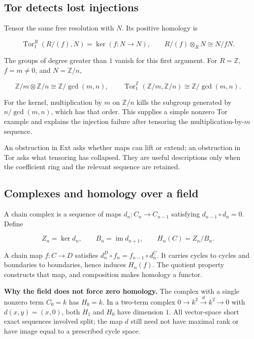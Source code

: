 \documentclass[
  11pt,
]{article}
\begin{document}
\subsection{Tor detects lost
injections}\label{tor-detects-lost-injections}

Tensor the same free resolution with \(N\). Its positive homology is

\[\operatorname{Tor}^R_1(R/(f),N)=\ker(f:N\to N),\qquad
R/(f)\otimes_R N\cong N/fN.\]

The groups of degree greater than \(1\) vanish for this first argument.
For \(R=\mathbb Z\), \(f=m\ne0\), and \(N=\mathbb Z/n\),

\[\mathbb Z/m\otimes\mathbb Z/n\cong\mathbb Z/\gcd(m,n),
\qquad
\operatorname{Tor}^{\mathbb Z}_1(\mathbb Z/m,\mathbb Z/n)
\cong\mathbb Z/\gcd(m,n).\]

For the kernel, multiplication by \(m\) on \(\mathbb Z/n\) kills the
subgroup generated by \(n/\gcd(m,n)\), which has that order. This
supplies a simple nonzero Tor example and explains the injection failure
after tensoring the multiplication-by-\(m\) sequence.

An obstruction in Ext asks whether maps can lift or extend; an
obstruction in Tor asks what tensoring has collapsed. They are useful
descriptions only when the coefficient ring and the relevant sequence
are retained.

\subsection{Complexes and homology over a
field}\label{complexes-and-homology-over-a-field}

A chain complex is a sequence of maps \(d_n:C_n\to C_{n-1}\) satisfying
\(d_{n-1}\circ d_n=0\). Define

\[Z_n=\ker d_n,\qquad B_n=\operatorname{im}d_{n+1},\qquad
H_n(C)=Z_n/B_n.\]

A chain map \(f:C\to D\) satisfies
\(d_n^D\circ f_n=f_{n-1}\circ d_n^C\). It carries cycles to cycles and
boundaries to boundaries, hence induces \(H_n(f)\). The quotient
property constructs that map, and composition makes homology a functor.

\textbf{Why the field does not force zero homology.} The complex with a
single nonzero term \(C_0=k\) has \(H_0=k\). In a two-term complex
\(0\to k^2\xrightarrow{d}k^2\to0\) with \(d(x,y)=(x,0)\), both \(H_1\)
and \(H_0\) have dimension \(1\). All vector-space short exact sequences
involved split; the map \(d\) still need not have maximal rank or have
image equal to a prescribed cycle space.
\end{document}
